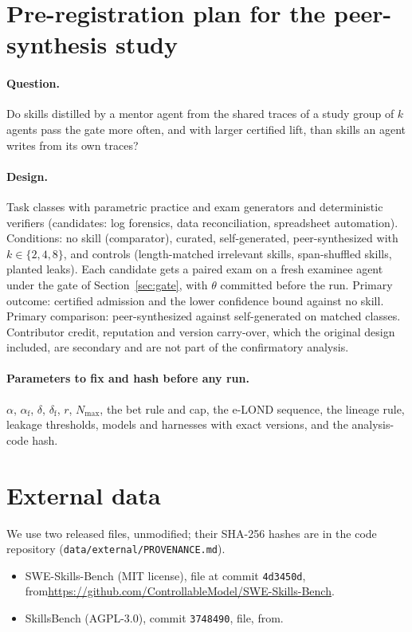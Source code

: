 \section{Pre-registration plan for the peer-synthesis study}
\label{app:campus}
\paragraph{Question.} Do skills distilled by a mentor agent from the shared traces of a study group of $k$ agents pass the gate more often, and with larger certified lift, than skills an agent writes from its own traces?
\paragraph{Design.} Task classes with parametric practice and exam generators and deterministic verifiers (candidates: log forensics, data reconciliation, spreadsheet automation). Conditions: no skill (comparator), curated, self-generated, peer-synthesized with $k\in\{2,4,8\}$, and controls (length-matched irrelevant skills, span-shuffled skills, planted leaks). Each candidate gets a paired exam on a fresh examinee agent under the gate of Section~\ref{sec:gate}, with $\theta$ committed before the run. Primary outcome: certified admission and the lower confidence bound against no skill. Primary comparison: peer-synthesized against self-generated on matched classes. Contributor credit, reputation and version carry-over, which the original design included, are secondary and are not part of the confirmatory analysis.
\paragraph{Parameters to fix and hash before any run.} $\alpha$, $\alpha_{\mathrm f}$, $\delta$, $\delta_{\mathrm f}$, $r$, $N_{\max}$, the bet rule and cap, the e-LOND sequence, the lineage rule, leakage thresholds, models and harnesses with exact versions, and the analysis-code hash.

\section{External data}
\label{app:data}
We use two released files, unmodified; their SHA-256 hashes are in the code repository (\texttt{data/external/PROVENANCE.md}).
\begin{itemize}
\item SWE-Skills-Bench (MIT license), file  at commit \texttt{4d3450d}, from\newline \url{https://github.com/ControllableModel/SWE-Skills-Bench}.
\item SkillsBench (AGPL-3.0), commit \texttt{3748490}, file\newline {}, from.
\end{itemize}
